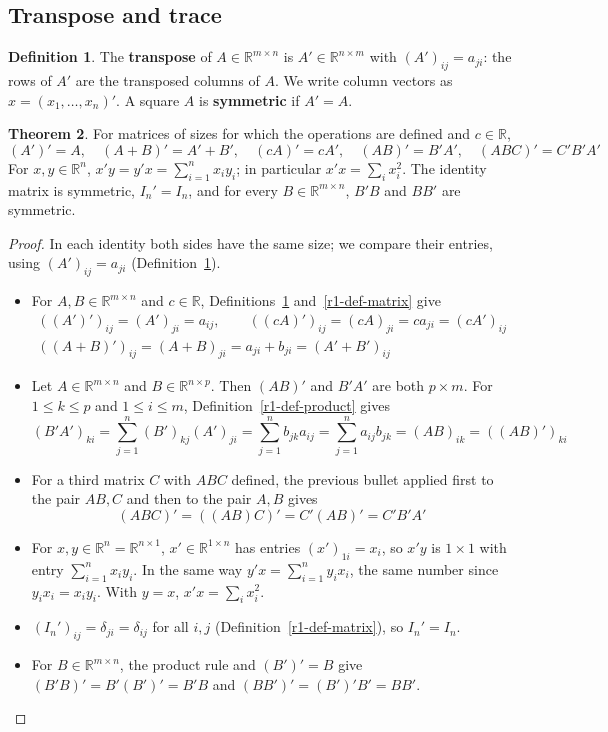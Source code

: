 \documentclass[12pt]{article}
\newcommand{\R}{\mathbb R}
\theoremstyle{definition}
\newtheorem{theorem}{Theorem}
\newtheorem{definition}[theorem]{Definition}
\begin{document}
\subsection*{Transpose and trace}

\begin{definition}\label{r1-def-transpose}
The \textbf{transpose} of \(A\in\R^{m\times n}\) is \(A'\in\R^{n\times m}\) with
\((A')_{ij}=a_{ji}\): the rows of \(A'\) are the transposed columns of \(A\). We write
column vectors as \(x=(x_1,\dots,x_n)'\). A square \(A\) is \textbf{symmetric} if
\(A'=A\).
\end{definition}

\begin{theorem}\label{r1-thm-transpose}
For matrices of sizes for which the operations are defined and \(c\in\R\),
\[
(A')'=A,\quad(A+B)'=A'+B',\quad(cA)'=cA',\quad
(AB)'=B'A',\quad(ABC)'=C'B'A'
\]
For \(x,y\in\R^n\), \(x'y=y'x=\sum_{i=1}^nx_iy_i\); in particular
\(x'x=\sum_ix_i^2\). The identity matrix is symmetric, \(I_n'=I_n\), and for every \(B\in\R^{m\times n}\), \(B'B\)
and \(BB'\) are symmetric.
\end{theorem}
\begin{proof}
In each identity both sides have the same size; we compare their entries, using
\((A')_{ij}=a_{ji}\) (Definition~\ref{r1-def-transpose}).
\begin{itemize}
\item For \(A,B\in\R^{m\times n}\) and \(c\in\R\), Definitions~\ref{r1-def-transpose}
and~\ref{r1-def-matrix} give
\[
\begin{gathered}
((A')')_{ij}=(A')_{ji}=a_{ij},\qquad ((cA)')_{ij}=(cA)_{ji}=ca_{ji}=(cA')_{ij}\\
((A+B)')_{ij}=(A+B)_{ji}=a_{ji}+b_{ji}=(A'+B')_{ij}
\end{gathered}
\]
\item Let \(A\in\R^{m\times n}\) and \(B\in\R^{n\times p}\). Then \((AB)'\) and \(B'A'\) are
both \(p\times m\). For \(1\leqslant k\leqslant p\) and \(1\leqslant i\leqslant m\),
Definition~\ref{r1-def-product} gives
\[
(B'A')_{ki}=\sum_{j=1}^n(B')_{kj}(A')_{ji}=\sum_{j=1}^n b_{jk}a_{ij}=\sum_{j=1}^n a_{ij}b_{jk}
=(AB)_{ik}=((AB)')_{ki}
\]
\item For a third matrix \(C\) with \(ABC\) defined, the previous bullet applied first to the
pair \(AB,C\) and then to the pair \(A,B\) gives
\[
(ABC)'=((AB)C)'=C'(AB)'=C'B'A'
\]
\item For \(x,y\in\R^n=\R^{n\times1}\), \(x'\in\R^{1\times n}\) has entries
\((x')_{1i}=x_i\), so \(x'y\) is \(1\times1\) with entry \(\sum_{i=1}^n x_iy_i\). In the same
way \(y'x=\sum_{i=1}^n y_ix_i\), the same number since \(y_ix_i=x_iy_i\). With \(y=x\),
\(x'x=\sum_ix_i^2\).
\item \((I_n')_{ij}=\delta_{ji}=\delta_{ij}\) for all \(i,j\) (Definition~\ref{r1-def-matrix}), so \(I_n'=I_n\).
\item For \(B\in\R^{m\times n}\), the product rule and \((B')'=B\) give
\((B'B)'=B'(B')'=B'B\) and \((BB')'=(B')'B'=BB'\).\qedhere
\end{itemize}
\end{proof}
\end{document}
